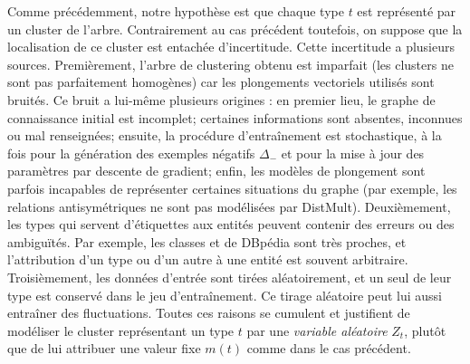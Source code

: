 
Comme précédemment, notre hypothèse est que chaque type $t$ est représenté par un cluster de l'arbre. Contrairement au cas précédent toutefois, on suppose que la localisation de ce cluster est entachée d'incertitude. Cette incertitude a plusieurs sources. Premièrement, l'arbre de clustering obtenu est imparfait (les clusters ne sont pas parfaitement homogènes) car les plongements vectoriels utilisés sont bruités. Ce bruit a lui-même plusieurs origines : en premier lieu, le graphe de connaissance initial est incomplet; certaines informations sont absentes, inconnues ou mal renseignées; ensuite, la procédure d'entraînement est stochastique, à la fois pour la génération des exemples négatifs $\Delta_-$ et pour la mise à jour des paramètres par descente de gradient; enfin, les modèles de plongement sont parfois incapables de représenter certaines situations du graphe (par exemple, les relations antisymétriques ne sont pas modélisées par DistMult). Deuxièmement, les types qui servent d'étiquettes aux entités peuvent contenir des erreurs ou des ambiguïtés. Par exemple, les classes  et  de DBpédia sont très proches, et l'attribution d'un type ou d'un autre à une entité est souvent arbitraire. Troisièmement, les données d'entrée sont tirées aléatoirement, et un seul de leur type est conservé dans le jeu d'entraînement. Ce tirage aléatoire peut lui aussi entraîner des fluctuations. Toutes ces raisons se cumulent et justifient de modéliser le cluster représentant un type $t$ par une \textit{variable aléatoire} $Z_t$, plutôt que de lui attribuer une valeur fixe $m(t)$ comme dans le cas précédent.


